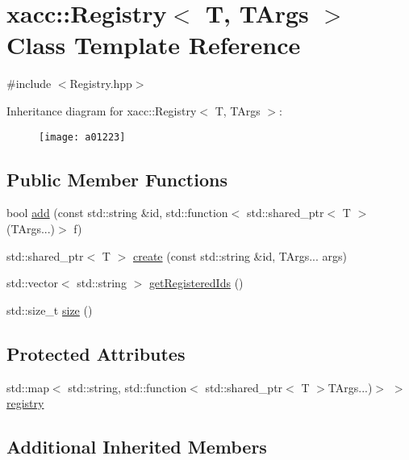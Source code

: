 \hypertarget{a01223}{}\section{xacc\+:\+:Registry$<$ T, T\+Args $>$ Class Template Reference}
\label{a01223}


{\ttfamily \#include $<$Registry.\+hpp$>$}

Inheritance diagram for xacc\+:\+:Registry$<$ T, T\+Args $>$\+:\begin{figure}[H]
\begin{center}
\leavevmode
\texttt{[image: a01223]}
\end{center}
\end{figure}
\subsection*{Public Member Functions}
\begin{DoxyCompactItemize}
\item 
bool \hyperlink{a01223_a9aa172c2603171db067b40bd62ba53c6}{add} (const std\+::string \&id, std\+::function$<$ std\+::shared\+\_\+ptr$<$ T $>$(T\+Args...)$>$ f)
\item 
std\+::shared\+\_\+ptr$<$ T $>$ \hyperlink{a01223_a3e71cc8d0effd065252608ee1ccdf207}{create} (const std\+::string \&id, T\+Args... args)
\item 
std\+::vector$<$ std\+::string $>$ \hyperlink{a01223_a8bff6f5c50534375abc4026662d69d2e}{get\+Registered\+Ids} ()
\item 
std\+::size\+\_\+t \hyperlink{a01223_a2352dd7c6c85ae5c5e232b577dfa2544}{size} ()
\end{DoxyCompactItemize}
\subsection*{Protected Attributes}
\begin{DoxyCompactItemize}
\item 
std\+::map$<$ std\+::string, std\+::function$<$ std\+::shared\+\_\+ptr$<$ T $>$T\+Args...)$>$ $>$ \hyperlink{a01223_a46460ecacc7facb6936b3c1ec6d618d7}{registry}
\end{DoxyCompactItemize}
\subsection*{Additional Inherited Members}


